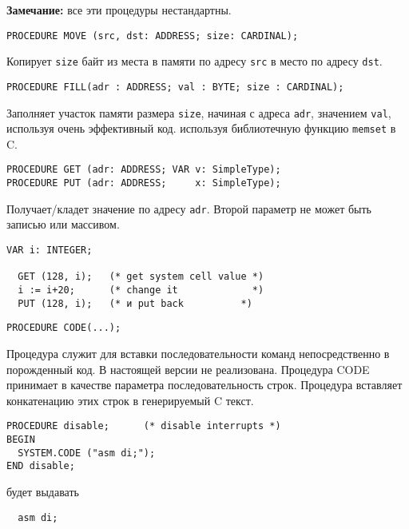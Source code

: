 {\bf Замечание:} все эти процедуры нестандартны.

\begin{verbatim}
PROCEDURE MOVE (src, dst: ADDRESS; size: CARDINAL);
\end{verbatim}

Копирует \verb|size| байт из места в памяти по адресу
\verb|src| в место по адресу \verb|dst|.

\begin{verbatim}
PROCEDURE FILL(adr : ADDRESS; val : BYTE; size : CARDINAL);
\end{verbatim}
Заполняет участок памяти размера \verb'size', начиная с адреса
\verb'adr', значением \verb'val',
\ifgencode
используя очень эффективный код.
\else
используя библиотечную функцию \verb'memset' в C.
\fi


\begin{verbatim}
PROCEDURE GET (adr: ADDRESS; VAR v: SimpleType);
PROCEDURE PUT (adr: ADDRESS;     x: SimpleType);
\end{verbatim}

Получает/кладет значение по адресу \verb|adr|.
Второй параметр не может быть записью или массивом.

\begin{verbatim}
VAR i: INTEGER;

  GET (128, i);   (* get system cell value *)
  i := i+20;      (* change it             *)
  PUT (128, i);   (* и put back          *)
\end{verbatim}

\begin{verbatim}
PROCEDURE CODE(...);
\end{verbatim}

\ifgencode
Процедура служит для вставки последовательности команд
непосредственно в порожденный код. В настоящей версии
не реализована.
\fi
\ifgenc
Процедура CODE принимает в качестве параметра последовательность
строк. Процедура вставляет конкатенацию этих строк в генерируемый
C текст.

\Example
\begin{verbatim}
PROCEDURE disable;      (* disable interrupts *)
BEGIN
  SYSTEM.CODE ("asm di;");
END disable;
\end{verbatim}
будет выдавать
\begin{verbatim}
  asm di;
\end{verbatim}
\fi


